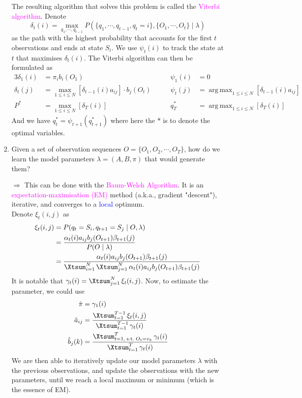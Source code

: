 \documentclass[UTF8]{book}
\DeclareMathOperator*{\argmax}{arg\,max}
\DeclareMathOperator*{\Xsum}{\mathchoice{\Xdsum}{\Xtsum}{\Xtsum}{\Xtsum}}
\newcommand{\et}{&}
\newcommand{\concept}[1]{\textcolor{magenta}{#1}}
\renewcommand{\emph}[1]{\textcolor{blue}{#1}}
\begin{document}
\begin{itemize}
\begin{itemize}
\begin{enumerate}
		The resulting algorithm that solves this problem is called the \concept{Viterbi algorithm}. Denote
		$$
		\delta_t(i) = \max_{q_1,\cdots,q_{t-1}}P(\{q_1,\cdots,q_{t-1},q_t=i\},\{O_1,\cdots,O_t\}\mid\lambda)
		$$
		as the path with the highest probability that accounts for the first $t$ observations and ends at state $S_i$. We use $\psi_t(i)$ to track the state at $t$ that maximises $\delta_t(i)$. The Viterbi algorithm can then be formulated as 
		\begin{alignat*}{3}
			\delta_1(i) &= \pi_i b_i (O_1) &\psi_1(i) & = 0 \\
			\delta_t(j) & = \max_{1\leq i\leq N}[\delta_{t-1}(i)a_{ij}]\cdot b_j(O_t)  \qquad & \psi_t(j) & = \argmax_{1\leq i\leq N}[\delta_{t-1}(i)a_{ij}]\\
			P^* \et = \max_{1\leq i\leq N}[\delta_T(i)] \et q_T^* \et = \argmax_{1\leq i\leq N}[\delta_T(i)]
		\end{alignat*}
		And we have $q_t^*=\psi_{t+1}(q^*_{t+1})$ where here the $*$ is to denote the optimal variables.
		\item Given a set of observation sequences $O = \{O_1,O_2,\cdots,O_T\}$, how do we learn the model parameters $\lambda = (A,B,\pi)$ that would generate them?
		\item[$\Rightarrow$]	This can be done with the \concept{Baum-Welch Algorithm}. It is an \concept{expectation-maximisation (EM)} method (a.k.a., gradient "descent"), iterative, and converges to a \emph{local} optimum. \\
		Denote $\xi_t(i,j)$ as
		\begin{align*}
		\xi_t(i,j) \et = P(q_t = S_i, q_{t+1} = S_j\mid O,\lambda)\\
		\et = \dfrac{\alpha_t(i)a_{ij}b_j(O_{t+1})\beta_{t+1}(j)}{P(O\mid\lambda)}\\
		\et = \dfrac{\alpha_t(i)a_{ij}b_j(O_{t+1})\beta_{t+1}(j)}{\Xsum_{i=1}^N\Xsum_{j=1}^N\alpha_t(i)a_{ij}b_j(O_{t+1})\beta_{t+1}(j)}
		\end{align*}
		It is notable that $\gamma_t(i) = \Xsum_{j=1}^N\xi_t(i,j)$. Now, to estimate the parameter, we could use
		\begin{align*}
			\hat{\pi} \et = \gamma_1(i)\\
			\hat{a}_{ij} \et = \dfrac{\Xsum_{t=1}^{T-1}\xi_t(i,j)}{\Xsum_{t=1}^{T-1}\gamma_t(i)}\\
			\hat{b}_j(k) \et = \dfrac{\Xsum^T_{t=1, \mathrm{\; s.t.\;}O_t=v_k}\gamma_t(i)}{\Xsum_{t=1}^T\gamma_t(i)}
		\end{align*}
		We are then able to iteratively update our model parameters $\lambda$ with the previous observations, and update the observations with the new parameters, until we reach a local maximum or minimum (which is the essence of EM).
	\end{enumerate}
\end{itemize}
\end{itemize}
\end{document}
